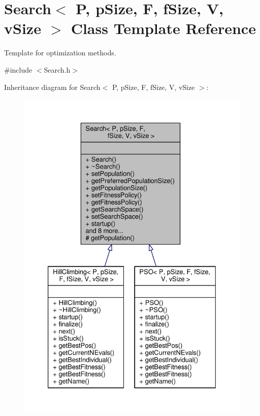 \hypertarget{classSearch}{}\section{Search$<$ P, p\+Size, F, f\+Size, V, v\+Size $>$ Class Template Reference}
\label{classSearch}


Template for optimization methods.  




{\ttfamily \#include $<$Search.\+h$>$}



Inheritance diagram for Search$<$ P, p\+Size, F, f\+Size, V, v\+Size $>$\+:
\nopagebreak
\begin{figure}[H]
\begin{center}
\leavevmode
\includegraphics[width=350pt]{classSearch__inherit__graph}
\end{center}
\end{figure}


